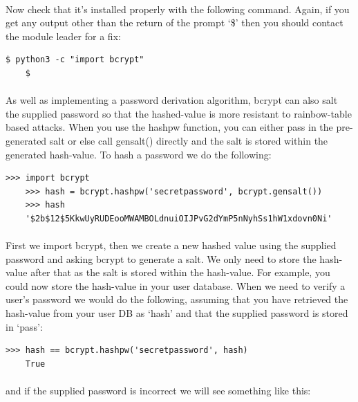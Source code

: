 \documentclass[12pt, a4paper, oneside]{book}
\begin{document}
\paragraph{} Now check that it's installed properly with the following command. Again, if you get any output other than the return of the prompt `\$' then you should contact the module leader for a fix: 
\begin{lstlisting}[style=DOS]
    $ python3 -c "import bcrypt"
    $
\end{lstlisting}

\paragraph{} As well as implementing a password derivation algorithm, bcrypt can also salt the supplied password so that the hashed-value is more resistant to rainbow-table based attacks. When you use the hashpw function, you can either pass in the pre-generated salt or else call gensalt() directly and the salt is stored within the generated hash-value. To hash a password we do the following:

\begin{lstlisting}[style=DOS]
    >>> import bcrypt
    >>> hash = bcrypt.hashpw('secretpassword', bcrypt.gensalt())
    >>> hash
    '$2b$12$5KkwUyRUDEooMWAMBOLdnuiOIJPvG2dYmP5nNyhSs1hW1xdovn0Ni'
\end{lstlisting}

\paragraph{} First we import bcrypt, then we create a new hashed value using the supplied password and asking bcrypt to generate a salt. We only need to store the hash-value after that as the salt is stored within the hash-value. For example, you could now store the hash-value in your user database. When we need to verify a user's password we would do the following, assuming that you have retrieved the hash-value from your user DB as `hash' and that the supplied password is stored in `pass':

\begin{lstlisting}[style=DOS]
    >>> hash == bcrypt.hashpw('secretpassword', hash)
    True
\end{lstlisting}

\paragraph{} and if the supplied password is incorrect we will see something like this:
\end{document}
